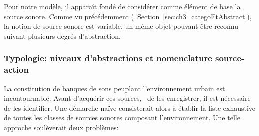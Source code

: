 Pour notre modèle, il apparaît fondé de considérer comme élément de base la source sonore. Comme vu précédemment (\cf~Section~\ref{sec:ch3_categoEtAbstract}), la notion de source sonore est variable, un même objet pouvant être reconnu suivant plusieurs degrés d'abstraction.

\subsubsection{Typologie: niveaux d'abstractions et nomenclature source-action}
\label{sec:ch4_sourceAction}

La constitution de banques de sons peuplant l'environnement urbain est incontournable. Avant d'acquérir ces sources, \ie~de les enregistrer, il est nécessaire de les identifier. Une démarche naïve consisterait alors à établir la liste exhaustive de toutes les classes de sources sonores composant l'environnement. Une telle approche soulèverait deux problèmes:

